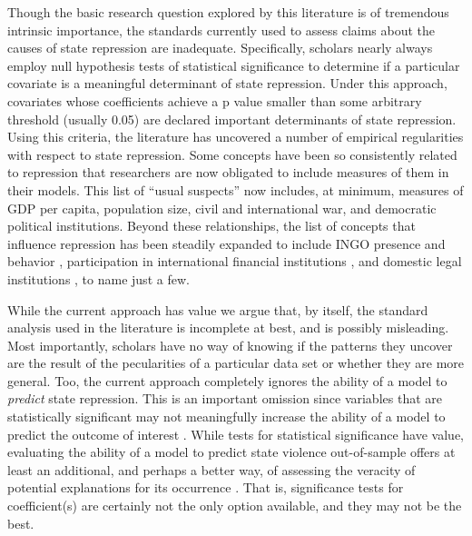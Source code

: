 \documentclass[12pt]{article}
\begin{document}
Though the basic research question explored by this literature is of tremendous intrinsic importance, the standards currently used to assess claims about the causes of state repression are inadequate. Specifically, scholars nearly always employ null hypothesis tests of statistical significance to determine if a particular covariate is a meaningful determinant of state repression. Under this approach, covariates whose coefficients achieve a p value smaller than some arbitrary threshold (usually 0.05) are declared important determinants of state repression. Using this criteria, the literature has uncovered a number of empirical regularities with respect to state repression. Some concepts have been so consistently related to repression that researchers are now obligated to include measures of them in their models. This list of ``usual suspects'' now includes, at minimum, measures of GDP per capita, population size, civil and international war, and democratic political institutions. Beyond these relationships, the list of concepts that influence repression has been steadily expanded to include INGO presence and behavior \citep{HafnerBurtonTsutsui2005, MurdieDavis2012}, participation in international financial institutions \citep{AbouharbCingranelli2006, AbouharbCingranelli2007}, and domestic legal institutions \citep{Cross1999, KeithTatePoe2009, Mitchell2013}, to name just a few. 

While the current approach has value we argue that, by itself, the standard analysis used in the literature is incomplete at best, and is possibly misleading. Most importantly, scholars have no way of knowing if the patterns they uncover are the result of the pecularities of a particular data set or whether they are more general. Too, the current approach completely ignores the ability of a model to {\em predict} state repression. This is an important omission since variables that are statistically significant may not meaningfully increase the ability of a model to predict the outcome of interest \citep{Wardetal2010}. While tests for statistical significance have value, evaluating the ability of a model to predict state violence out-of-sample offers at least an additional, and perhaps a better way, of assessing the veracity of potential explanations for its occurrence \citep[See, e.g.][]{BeckKingZeng2000}. That is, significance tests for coefficient(s) are certainly not the only option available, and they may not be the best. 
\end{document}
